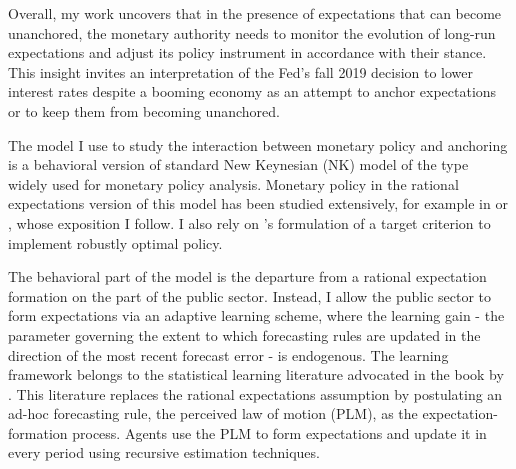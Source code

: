 \documentclass[11pt]{article}
\renewcommand{\[}{\begin{equation}}
\renewcommand{\]}{\end{equation}}
\begin{document}
Overall, my work uncovers that in the presence of expectations that can become unanchored, the monetary authority needs to monitor the evolution of long-run expectations and adjust its policy instrument in accordance with their stance. This insight invites an interpretation of the Fed's fall 2019 decision to lower interest rates despite a booming economy as an attempt to anchor expectations or to keep them from becoming unanchored. 

The model I use to study the interaction between monetary policy and anchoring is a behavioral version of standard New Keynesian (NK) model of the type widely used for monetary policy analysis. Monetary policy in the rational expectations version of this model has been studied extensively, for example in \cite{clarida1999science} or \cite{woodford2011interest}, whose exposition I follow. I also rely on \cite{woodford2011interest}'s formulation of a target criterion to implement robustly optimal policy.

The behavioral part of the model is the departure from a rational expectation formation on the part of the public sector. Instead, I allow the public sector to form expectations via an adaptive learning scheme, where the learning gain - the parameter governing the extent to which forecasting rules are updated in the direction of the most recent forecast error - is endogenous. The learning framework belongs to the statistical learning literature advocated in the book by \cite{evans_honkapohja2001}. This literature replaces the rational expectations assumption by postulating an ad-hoc forecasting rule, the perceived law of motion (PLM), as the expectation-formation process. Agents use the PLM to form expectations and update it in every period using recursive estimation techniques. 

%
\end{document}
